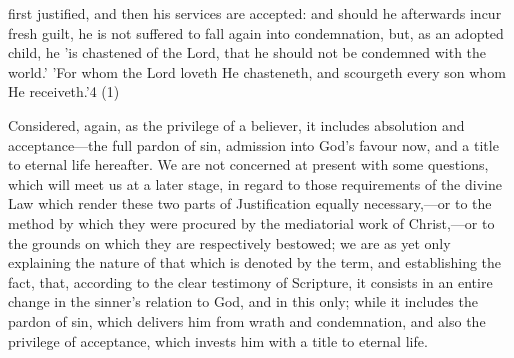 \documentclass[
]{book}
\begin{document}
first justified, and then his services are accepted: and should he afterwards incur fresh guilt, he is not suffered to fall again into condemnation, but, as an adopted child, he 'is chastened of the Lord, that he should not be condemned with the world.' 'For whom the Lord loveth He chasteneth, and scourgeth every son whom He receiveth.'4 (1)

Considered, again, as the privilege of a believer, it includes absolution and acceptance---the full pardon of sin, admission into God's favour now, and a title to eternal life hereafter. We are not concerned at present with some questions, which will meet us at a later stage, in regard to those requirements of the divine Law which render these two parts of Justification equally necessary,---or to the method by which they were procured by the mediatorial work of Christ,---or to the grounds on which they are respectively bestowed; we are as yet only explaining the nature of that which is denoted by the term, and establishing the fact, that, according to the clear testimony of Scripture, it consists in an entire change in the sinner's relation to God, and in this only; while it includes the pardon of sin, which delivers him from wrath and condemnation, and also the privilege of acceptance, which invests him with a title to eternal life.
\end{document}
